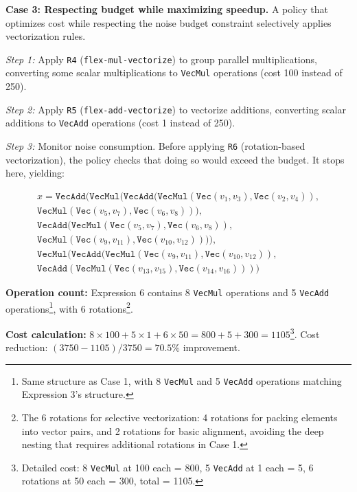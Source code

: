 \textbf{Case 3: Respecting budget while maximizing speedup.} A policy that optimizes cost while respecting the noise budget constraint selectively applies vectorization rules.

\textit{Step 1:} Apply \texttt{R4} (\texttt{flex-mul-vectorize}) to group parallel multiplications, converting some scalar multiplications to \texttt{VecMul} operations (cost 100 instead of 250).

\textit{Step 2:} Apply \texttt{R5} (\texttt{flex-add-vectorize}) to vectorize additions, converting scalar additions to \texttt{VecAdd} operations (cost 1 instead of 250).

\textit{Step 3:} Monitor noise consumption. Before applying \texttt{R6} (rotation-based vectorization), the policy checks that doing so would exceed the budget. It stops here, yielding:

{
\shrink[1.2]
\CodeSize
\begin{multline}
x = \texttt{VecAdd}(\texttt{VecMul}(\texttt{VecAdd}(\texttt{VecMul}(\texttt{Vec}(v_1, v_3), \texttt{Vec}(v_2, v_4)), \\
\texttt{VecMul}(\texttt{Vec}(v_5, v_7), \texttt{Vec}(v_6, v_8))), \\
\texttt{VecAdd}(\texttt{VecMul}(\texttt{Vec}(v_5, v_7), \texttt{Vec}(v_6, v_8)), \\
\texttt{VecMul}(\texttt{Vec}(v_9, v_{11}), \texttt{Vec}(v_{10}, v_{12})))), \\
\texttt{VecMul}(\texttt{VecAdd}(\texttt{VecMul}(\texttt{Vec}(v_9, v_{11}), \texttt{Vec}(v_{10}, v_{12})), \\
\texttt{VecAdd}(\texttt{VecMul}(\texttt{Vec}(v_{13}, v_{15}), \texttt{Vec}(v_{14}, v_{16}))))
\label{eq:case3-final}
\tag{6}
\end{multline}
\shrink[1.2]
}

\textbf{Operation count:} Expression 6 contains 8 \texttt{VecMul} operations and 5 \texttt{VecAdd} operations\footnote{Same structure as Case 1, with 8 \texttt{VecMul} and 5 \texttt{VecAdd} operations matching Expression 3's structure.}, with 6 rotations\footnote{The 6 rotations for selective vectorization: 4 rotations for packing elements into vector pairs, and 2 rotations for basic alignment, avoiding the deep nesting that requires additional rotations in Case 1.}.

\textbf{Cost calculation:} $8 \times 100 + 5 \times 1 + 6 \times 50 = 800 + 5 + 300 = 1105$\footnote{Detailed cost: 8 \texttt{VecMul} at 100 each = 800, 5 \texttt{VecAdd} at 1 each = 5, 6 rotations at 50 each = 300, total = 1105.}. Cost reduction: $(3750 - 1105) / 3750 = 70.5\%$ improvement.

